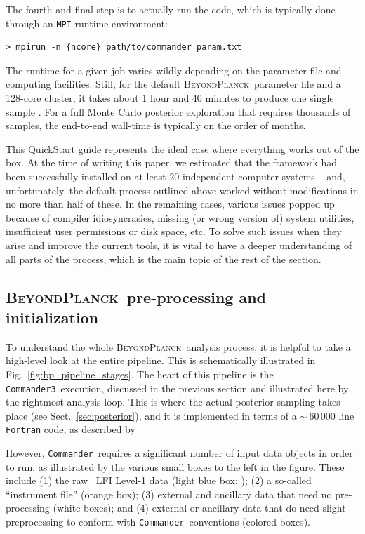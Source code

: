 \documentclass[twocolumn]{aa}
\def\commander{\texttt{Commander}}
\def\commanderthree{\texttt{Commander3}}
\newcommand{\BP}{\textsc{BeyondPlanck}}
\begin{document}
The fourth and final step is to actually run the code, which is
typically done through an \texttt{MPI} runtime environment:
\begin{verbatim}
> mpirun -n {ncore} path/to/commander param.txt
\end{verbatim}
The runtime for a given job varies wildly depending on the parameter file and computing facilities. Still, for the default \BP\ parameter file and a 128-core cluster, it takes about 1 hour and 40 minutes to produce one single sample \citep{BP03}. For a full Monte Carlo posterior exploration that requires thousands of samples, the end-to-end wall-time is typically on the order of months.

This QuickStart guide represents the ideal case where everything works out of the box. At the time of writing this paper, we estimated that the framework had been successfully installed on at least 20 independent computer systems -- and, unfortunately, the default process outlined above worked without modifications in no more than half of these. In the remaining cases, various issues popped up because of compiler idiosyncrasies, missing (or wrong version of) system utilities, insufficient user permissions or disk space, etc. To solve such issues when they arise and improve the current tools, it is vital to have a deeper understanding of all parts of the process, which is the main topic of the rest of the section.

\subsection{\BP\ pre-processing and initialization}
\label{sec:pipeline}

To understand the whole \BP\ analysis process, it is helpful to take a high-level look at the entire pipeline. This is schematically illustrated in Fig.~\ref{fig:bp_pipeline_stages}. The heart of this pipeline is the \commanderthree\ execution, discussed in the previous section and illustrated here by the rightmost analysis loop. This is where the actual posterior sampling takes place (see Sect.~\ref{sec:posterior}), and it is implemented in terms of a $\sim$\,60\,000 line \texttt{Fortran} code, as described by \citet{BP03}

However, \commander\ requires a significant number of input data objects in order to run, as illustrated by the various small boxes to the left in the figure. These include (1) the raw \Planck\ LFI Level-1 data (light blue box; \citealp{planck2016-l02}); (2) a so-called ``instrument file'' (orange box); (3) external and ancillary data that need no pre-processing (white boxes); and (4) external or ancillary data that do need slight preprocessing to conform with \commander\ conventions (colored boxes).
\end{document}
